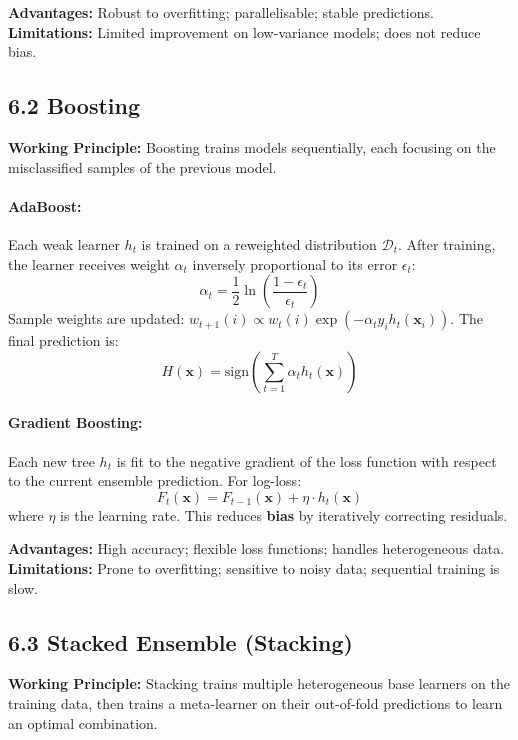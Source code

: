 \documentclass[12pt,a4paper]{article}
\begin{document}
\textbf{Advantages:} Robust to overfitting; parallelisable; stable predictions.\\
\textbf{Limitations:} Limited improvement on low-variance models; does not reduce bias.

\subsection*{6.2 Boosting}

\textbf{Working Principle:}
Boosting trains models sequentially, each focusing on the misclassified samples of the previous model.

\paragraph{AdaBoost:}
Each weak learner $h_t$ is trained on a reweighted distribution $\mathcal{D}_t$.
After training, the learner receives weight $\alpha_t$ inversely proportional to its error $\epsilon_t$:
\[
\alpha_t = \frac{1}{2} \ln\!\left(\frac{1 - \epsilon_t}{\epsilon_t}\right)
\]
Sample weights are updated: $w_{t+1}(i) \propto w_t(i) \exp(-\alpha_t y_i h_t(\mathbf{x}_i))$.
The final prediction is:
\[
H(\mathbf{x}) = \text{sign}\!\left(\sum_{t=1}^{T} \alpha_t h_t(\mathbf{x})\right)
\]

\paragraph{Gradient Boosting:}
Each new tree $h_t$ is fit to the negative gradient of the loss function with respect to the
current ensemble prediction. For log-loss:
\[
F_t(\mathbf{x}) = F_{t-1}(\mathbf{x}) + \eta \cdot h_t(\mathbf{x})
\]
where $\eta$ is the learning rate. This reduces \textbf{bias} by iteratively correcting residuals.

\textbf{Advantages:} High accuracy; flexible loss functions; handles heterogeneous data.\\
\textbf{Limitations:} Prone to overfitting; sensitive to noisy data; sequential training is slow.

\subsection*{6.3 Stacked Ensemble (Stacking)}

\textbf{Working Principle:}
Stacking trains multiple heterogeneous base learners on the training data, then trains a meta-learner
on their out-of-fold predictions to learn an optimal combination.
\end{document}
